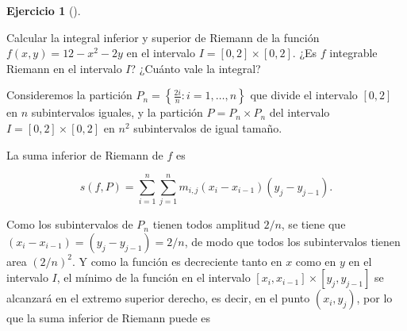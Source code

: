 \documentclass[
  a4paper,
]{scrreport}
\theoremstyle{definition}
\newtheorem{exercise}{Ejercicio}[chapter]
\theoremstyle{remark}
\begin{document}
\begin{exercise}[]\protect\hypertarget{exr-integral-inferior-superior-riemann-n-dimensional}{}\label{exr-integral-inferior-superior-riemann-n-dimensional}

Calcular la integral inferior y superior de Riemann de la función
\(f(x,y)=12-x^2-2y\) en el intervalo \(I=[0,2]\times[0,2]\). ¿Es \(f\)
integrable Riemann en el intervalo \(I\)? ¿Cuánto vale la integral?

\end{exercise}

\begin{tcolorbox}[enhanced jigsaw, coltitle=black, toptitle=1mm, colframe=quarto-callout-tip-color-frame, colbacktitle=quarto-callout-tip-color!10!white, breakable, opacityback=0, bottomtitle=1mm, opacitybacktitle=0.6, title=\textcolor{quarto-callout-tip-color}{\faLightbulb}\hspace{0.5em}{Solución}, arc=.35mm, leftrule=.75mm, toprule=.15mm, titlerule=0mm, bottomrule=.15mm, left=2mm, rightrule=.15mm, colback=white]

Consideremos la partición
\(P_n = \left\{\frac{2i}{n}: i=1,\ldots,n\right\}\) que divide el
intervalo \([0,2]\) en \(n\) subintervalos iguales, y la partición
\(P=P_n\times P_n\) del intervalo \(I=[0,2]\times[0,2]\) en \(n^2\)
subintervalos de igual tamaño.

La suma inferior de Riemann de \(f\) es

\[
s(f,P) = \sum_{i=1}^n\sum_{j=1}^n m_{i,j} (x_i-x_{i-1})(y_j-y_{j-1}).
\]

Como los subintervalos de \(P_n\) tienen todos amplitud \(2/n\), se
tiene que \((x_i-x_{i-1}) = (y_j-y_{j-1}) = 2/n\), de modo que todos los
subintervalos tienen area \((2/n)^2\). Y como la función es decreciente
tanto en \(x\) como en \(y\) en el intervalo \(I\), el mínimo de la
función en el intervalo \([x_i,x_{i-1}]\times[y_j,y_{j-1}]\) se
alcanzará en el extremo superior derecho, es decir, en el punto
\((x_i,y_j)\), por lo que la suma inferior de Riemann puede es


\end{tcolorbox}
\end{document}
